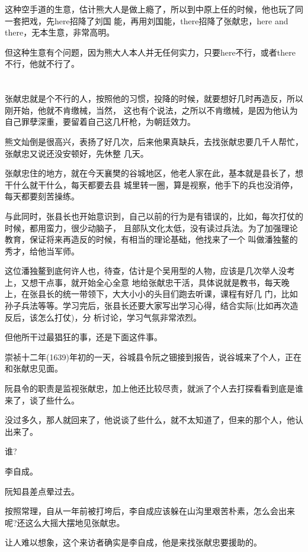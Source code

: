 \documentclass[11pt,a4paper,onecolumn]{article}
\begin{document}
这种空手道的生意，估计熊大人是做上瘾了，所以到中原上任的时候，他也玩了同一套把戏，先here招降了刘国
能，再用刘国能，there招降了张献忠，here and there，无本生意，非常高明。

但这种生意有个问题，因为熊大人本人并无任何实力，只要here不行，或者there不行，他就不行了。

\section[\thesection]{}

张献忠就是个不行的人，按照他的习惯，投降的时候，就要想好几时再造反，所以刚开始，他就不肯缴械，当然，
这也有个说法，之所以不肯缴械，是因为他认为自己罪孽深重，要留着自己这几杆枪，为朝廷效力。

熊文灿倒是很高兴，表扬了好几次，后来他果真缺兵，去找张献忠要几千人帮忙，张献忠又说还没安顿好，先休整
几天。

张献忠住的地方，就在今天襄樊的谷城地区，他老人家在此，基本就是县长了，想干什么就干什么，每天都要去县
城里转一圈，算是视察，他手下的兵也没消停，每天都要刻苦操练。

与此同时，张县长也开始意识到，自己以前的行为是有错误的，比如，每次打仗的时候，都用蛮力，很少动脑子，
且部队文化太低，没有读过兵法。为了加强理论教育，保证将来再造反的时候，有相当的理论基础，他找来了一个
叫做潘独鳌的秀才，给他当军师。

这位潘独鳌到底何许人也，待查，估计是个吴用型的人物，应该是几次举人没考上，又想干点事，就开始全心全意
地给张献忠干活，具体说就是教书，每天晚上，在张县长的统一带领下，大大小小的头目们跑去听课，课程有好几
门，比如孙子兵法等等。学习完后，张县长还要大家写出学习心得，结合实际(比如再次造反后，该怎么打仗)，分
析讨论，学习气氛非常浓烈。

但他所干过最猖狂的事，还是下面这件事。

崇祯十二年(1639)年初的一天，谷城县令阮之钿接到报告，说谷城来了个人，正在和张献忠见面。

阮县令的职责是监视张献忠，加上他还比较尽责，就派了个人去打探看看到底是谁来了，谈了些什么。

没过多久，那人就回来了，他说谈了些什么，就不太知道了，但来的那个人，他认出来了。

谁?

李自成。

阮知县差点晕过去。

按照常理，自从一年前被打垮后，李自成应该躲在山沟里艰苦朴素，怎么会出来呢?还这么大摇大摆地见张献忠。

让人难以想象，这个来访者确实是李自成，他是来找张献忠要援助的。
\end{document}
